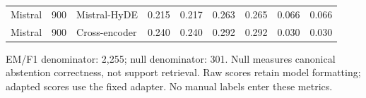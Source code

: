 \begin{table}[!htbp]
\begin{threeparttable}
\begin{tabular}{lllrrrrrr}
Mistral & 900 & Mistral-HyDE & 0.215 & 0.217 & 0.263 & 0.265 & 0.066 & 0.066 \\
Mistral & 900 & Cross-encoder & 0.240 & 0.240 & 0.292 & 0.292 & 0.030 & 0.030 \\
\bottomrule
\end{tabular}
\begin{tablenotes}\scriptsize\item EM/F1 denominator: 2,255; null denominator: 301. Null measures canonical abstention correctness, not support retrieval. Raw scores retain model formatting; adapted scores use the fixed adapter. No manual labels enter these metrics.
\end{tablenotes}
\end{threeparttable}
\end{table}
